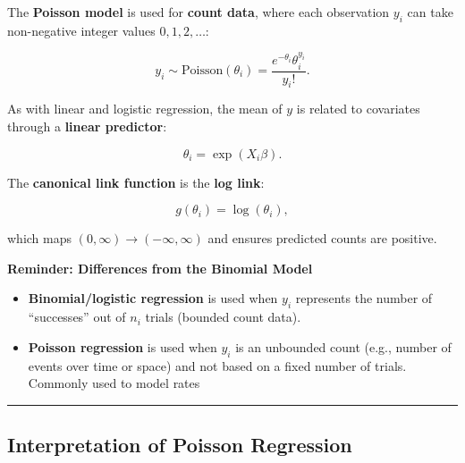 \documentclass[
  letterpaper,
  DIV=11,
  numbers=noendperiod]{scrreprt}
\providecommand{\tightlist}{%
  \setlength{\itemsep}{0pt}\setlength{\parskip}{0pt}}\usepackage{longtable,booktabs,array}
\begin{document}

The \textbf{Poisson model} is used for \textbf{count data}, where each
observation \(y_i\) can take non-negative integer values
\(0, 1, 2, \dots\):

\[
y_i \sim \text{Poisson}(\theta_i) = \frac{e^{-\theta_i} \theta_i^{y_i}}{y_i!}.
\]

As with linear and logistic regression, the mean of \(y\) is related to
covariates through a \textbf{linear predictor}:

\[
\theta_i = \exp(X_i \beta).
\]

The \textbf{canonical link function} is the \textbf{log link}:

\[
g(\theta_i) = \log(\theta_i),
\]

which maps \((0, \infty) \rightarrow (-\infty, \infty)\) and ensures
predicted counts are positive.

\begin{tcolorbox}[enhanced jigsaw, rightrule=.15mm, breakable, left=2mm, colframe=quarto-callout-note-color-frame, opacityback=0, leftrule=.75mm, toprule=.15mm, colback=white, arc=.35mm, bottomrule=.15mm]

\textbf{Reminder: Differences from the Binomial Model}\vspace{2mm}

\begin{itemize}
\tightlist
\item
  \textbf{Binomial/logistic regression} is used when \(y_i\) represents
  the number of ``successes'' out of \(n_i\) trials (bounded count
  data).\\
\item
  \textbf{Poisson regression} is used when \(y_i\) is an unbounded count
  (e.g., number of events over time or space) and not based on a fixed
  number of trials. Commonly used to model rates
\end{itemize}

\end{tcolorbox}

\begin{center}\rule{0.5\linewidth}{0.5pt}\end{center}

\hypertarget{interpretation-of-poisson-regression}{%
\subsection*{Interpretation of Poisson
Regression}\label{interpretation-of-poisson-regression}}
\end{document}
